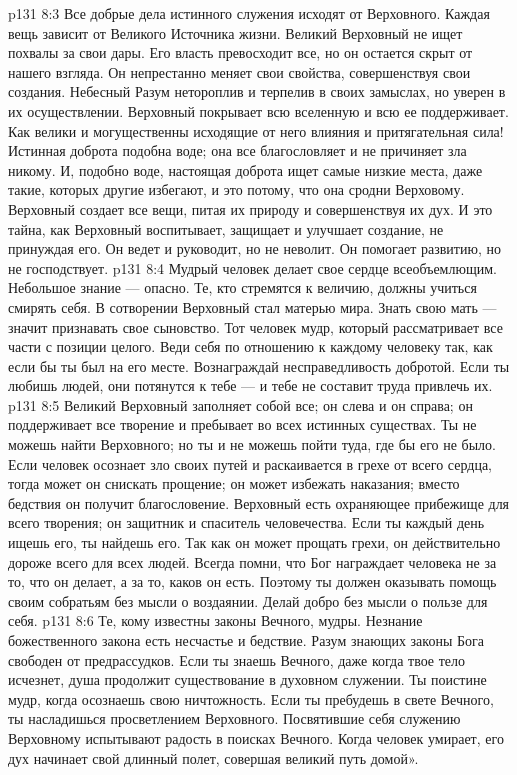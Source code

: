 \vs p131 8:3 Все добрые дела истинного служения исходят от Верховного. Каждая вещь зависит от Великого Источника жизни. Великий Верховный не ищет похвалы за свои дары. Его власть превосходит все, но он остается скрыт от нашего взгляда. Он непрестанно меняет свои свойства, совершенствуя свои создания. Небесный Разум нетороплив и терпелив в своих замыслах, но уверен в их осуществлении. Верховный покрывает всю вселенную и всю ее поддерживает. Как велики и могущественны исходящие от него влияния и притягательная сила! Истинная доброта подобна воде; она все благословляет и не причиняет зла никому. И, подобно воде, настоящая доброта ищет самые низкие места, даже такие, которых другие избегают, и это потому, что она сродни Верховому. Верховный создает все вещи, питая их природу и совершенствуя их дух. И это тайна, как Верховный воспитывает, защищает и улучшает создание, не принуждая его. Он ведет и руководит, но не неволит. Он помогает развитию, но не господствует.
\vs p131 8:4 Мудрый человек делает свое сердце всеобъемлющим. Небольшое знание --- опасно. Те, кто стремятся к величию, должны учиться смирять себя. В сотворении Верховный стал матерью мира. Знать свою мать --- значит признавать свое сыновство. Тот человек мудр, который рассматривает все части с позиции целого. Веди себя по отношению к каждому человеку так, как если бы ты был на его месте. Вознаграждай несправедливость добротой. Если ты любишь людей, они потянутся к тебе --- и тебе не составит труда привлечь их.
\vs p131 8:5 Великий Верховный заполняет собой все; он слева и он справа; он поддерживает все творение и пребывает во всех истинных существах. Ты не можешь найти Верховного; но ты и не можешь пойти туда, где бы его не было. Если человек осознает зло своих путей и раскаивается в грехе от всего сердца, тогда может он снискать прощение; он может избежать наказания; вместо бедствия он получит благословение. Верховный есть охраняющее прибежище для всего творения; он защитник и спаситель человечества. Если ты каждый день ищешь его, ты найдешь его. Так как он может прощать грехи, он действительно дороже всего для всех людей. Всегда помни, что Бог награждает человека не за то, что он делает, а за то, каков он есть. Поэтому ты должен оказывать помощь своим собратьям без мысли о воздаянии. Делай добро без мысли о пользе для себя.
\vs p131 8:6 Те, кому известны законы Вечного, мудры. Незнание божественного закона есть несчастье и бедствие. Разум знающих законы Бога свободен от предрассудков. Если ты знаешь Вечного, даже когда твое тело исчезнет, душа продолжит существование в духовном служении. Ты поистине мудр, когда осознаешь свою ничтожность. Если ты пребудешь в свете Вечного, ты насладишься просветлением Верховного. Посвятившие себя служению Верховному испытывают радость в поисках Вечного. Когда человек умирает, его дух начинает свой длинный полет, совершая великий путь домой».
